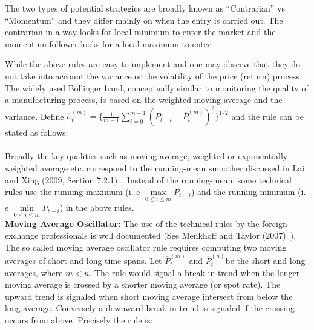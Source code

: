 The two types of potential strategies are broadly known as ``Contrarian'' vs ``Momentum'' and they differ mainly on when the entry is carried out. The contrarian in a way looks for local minimum to enter the market and the momentum follower looks for a local maximum to enter.


While the above rules are easy to implement and one may observe that they do not take into account the variance or the volatility of the price (return) process. The widely used Bollinger band, conceptually similar to monitoring the quality of a manufacturing process, is based on the weighted moving average and the variance. Define $\hat{\sigma}_{t}^{(m)} = \{\frac{1}{m-1}\sum_{i=0}^{m-1}(P_{t-i} - \overline{P}_{t}^{(m)})^2\}^{1/2}$ and the rule can be stated as follows: \\[0.1cm]
\noindent{} \\


Broadly the key qualities such as moving average, weighted or exponentially weighted average etc. correspond to the running-mean smoother discussed in Lai and Xing (2009, Section 7.2.1)~\cite{lai1}. Instead of the running-mean, some technical rules use the running maximum (i. e $\max\limits_{0 \leq i \leq m} P_{t-i}$) and the running minimum (i. e $\min\limits_{0 \leq i \leq m} P_{t-i}$) in the above rules. \\


\noindent \textbf{Moving Average Oscillator:} The use of the technical rules by the foreign exchange professionals is well documented (See Menkhoff and Taylor (2007)~\cite{MalTay}). The so called moving average oscillator rule requires computing two moving averages of short and long time spans. Let $\overline{P}_{t}^{(m)}$ and $\overline{P}_{t}^{(n)}$be the short and long averages, where $m< n$. The rule would signal a break in trend when the longer moving average is crossed by a shorter moving average (or spot rate). The upward trend is signaled when short moving average intersect from below the long average. Conversely a downward break in trend is signaled if the crossing occurs from above. Precisely the rule is: \\[0.1cm]

\noindent{} \\


